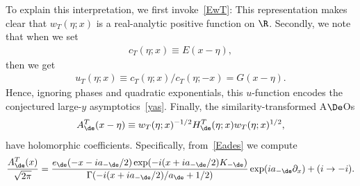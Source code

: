 \documentclass[pdftex]{sigma}
\numberwithin{equation}{section}
\begin{document}
To explain this interpretation, we f\/irst invoke~\eqref{EwT}: This representation makes clear that $w_T(\eta;x)$ is a real-analytic positive function on $\R$. Secondly, we note that when we set
 \begin{gather}
 c_T(\eta;x)\equiv E(x-\eta),
 \end{gather}
 then we get
 \begin{gather}
 u_T(\eta;x)\equiv c_T(\eta;x)/c_T(\eta;-x)=G(x-\eta).
 \end{gather}
 Hence, ignoring phases and quadratic exponentials, this $u$-function encodes the conjectured large-$y$ asymptotics~\eqref{yas}. Finally, the similarity-transformed A$\De$Os
 \begin{gather}
A_{\de}^T(x-\eta)\equiv w_T(\eta;x)^{-1/2}H_{\de}^T(\eta;x)w_T(\eta;x)^{1/2},
\end{gather}
have holomorphic coef\/f\/icients. Specif\/ically, from~\eqref{Eades} we compute
\begin{gather}\label{ATnew}
\frac{A_{\de}^T(x)}{\sqrt{2\pi}}
=    \frac{e_{\de}(-x-ia_{-\de}/2)\exp(-i(x+ia_{-\de}/2)K_{-\de})}{\Gamma(-i(x+ia_{-\de}/2)/a_{\de}+1/2)}\exp(ia_{-\de}\partial_x)+(i\to -i).
\end{gather}
\end{document}

